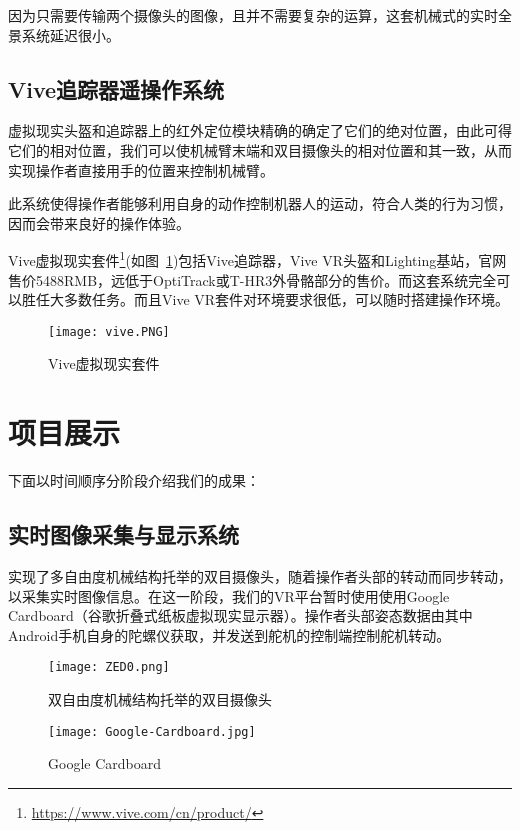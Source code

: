 因为只需要传输两个摄像头的图像，且并不需要复杂的运算，这套机械式的实时全景系统延迟很小。

\section{Vive追踪器遥操作系统}

虚拟现实头盔和追踪器上的红外定位模块精确的确定了它们的绝对位置，由此可得它们的相对位置，我们可以使机械臂末端和双目摄像头的相对位置和其一致，从而实现操作者直接用手的位置来控制机械臂。

此系统使得操作者能够利用自身的动作控制机器人的运动，符合人类的行为习惯，因而会带来良好的操作体验。

Vive虚拟现实套件\footnote{\url{https://www.vive.com/cn/product/}}(如图~\ref{vivekit})包括Vive追踪器，Vive VR头盔和Lighting基站，官网售价5488RMB，远低于OptiTrack或T-HR3外骨骼部分的售价。而这套系统完全可以胜任大多数任务。而且Vive VR套件对环境要求很低，可以随时搭建操作环境。
\begin{figure}[H]
\small
\centering
\texttt{[image: vive.PNG]}
\caption{Vive虚拟现实套件} 
\label{vivekit}
\end{figure}




\chapter{项目展示}
下面以时间顺序分阶段介绍我们的成果：

\section{实时图像采集与显示系统}
实现了多自由度机械结构托举的双目摄像头，随着操作者头部的转动而同步转动，以采集实时图像信息。在这一阶段，我们的VR平台暂时使用使用Google Cardboard（谷歌折叠式纸板虚拟现实显示器）。操作者头部姿态数据由其中Android手机自身的陀螺仪获取，并发送到舵机的控制端控制舵机转动。

\begin{figure}
\begin{minipage}{0.48\textwidth}
  \centering
  \texttt{[image: ZED0.png]}
  \caption{双自由度机械结构托举的双目摄像头}
  \label{zed}
\end{minipage}\hfill
\begin{minipage}{0.48\textwidth}
  \centering
  \texttt{[image: Google-Cardboard.jpg]}
  \caption{Google Cardboard}
  \label{bump}
\end{minipage}
\end{figure}

